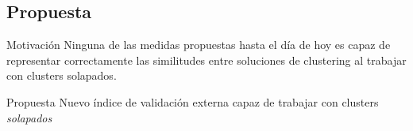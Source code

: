 \subsection{Propuesta}
\begin{frame}[t]
	\begin{block} {Motivación}
		Ninguna de las medidas propuestas hasta el día de hoy es capaz de representar correctamente
		las similitudes entre soluciones de clustering al trabajar con clusters solapados.	
	\end{block}
\vspace{7mm}
\pause
	\begin{block} {Propuesta}
		Nuevo índice de validación externa capaz de trabajar con clusters \textit{solapados}
	\end{block}
\end{frame}
